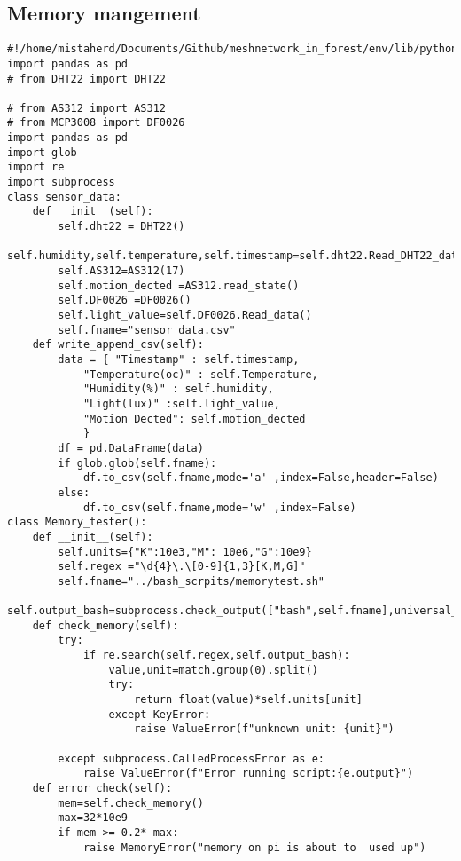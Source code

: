 \subsection{Memory mangement}
\begin{lstlisting}[style=mystyle,caption={Code for  memory mangement}]
#!/home/mistaherd/Documents/Github/meshnetwork_in_forest/env/lib/python3.11
import pandas as pd
# from DHT22 import DHT22

# from AS312 import AS312
# from MCP3008 import DF0026
import pandas as pd
import glob
import re 
import subprocess
class sensor_data:
	def __init__(self):
		self.dht22 = DHT22()
		self.humidity,self.temperature,self.timestamp=self.dht22.Read_DHT22_data()
		self.AS312=AS312(17)
		self.motion_dected =AS312.read_state()
		self.DF0026 =DF0026()
		self.light_value=self.DF0026.Read_data()
		self.fname="sensor_data.csv"
	def write_append_csv(self):
		data = { "Timestamp" : self.timestamp,
			"Temperature(oc)" : self.Temperature,
			"Humidity(%)" : self.humidity,
			"Light(lux)" :self.light_value,
			"Motion Dected": self.motion_dected
			}
		df = pd.DataFrame(data)
		if glob.glob(self.fname):	
			df.to_csv(self.fname,mode='a' ,index=False,header=False)
		else:
			df.to_csv(self.fname,mode='w' ,index=False)
class Memory_tester():
	def __init__(self):
		self.units={"K":10e3,"M": 10e6,"G":10e9}
		self.regex ="\d{4}\.\[0-9]{1,3}[K,M,G]"
		self.fname="../bash_scrpits/memorytest.sh" 
		self.output_bash=subprocess.check_output(["bash",self.fname],universal_newlines=True)
	def check_memory(self):
		try:
			if re.search(self.regex,self.output_bash):
				value,unit=match.group(0).split()
				try:
					return float(value)*self.units[unit]
				except KeyError:
					raise ValueError(f"unknown unit: {unit}")
			
		except subprocess.CalledProcessError as e:
			raise ValueError(f"Error running script:{e.output}")
	def error_check(self):
		mem=self.check_memory()
		max=32*10e9
		if mem >= 0.2* max:
			raise MemoryError("memory on pi is about to  used up")
		
\end{lstlisting}
